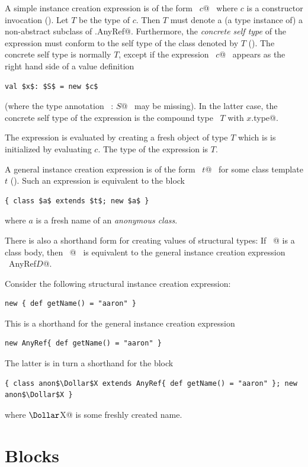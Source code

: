 A simple instance creation expression is of the form 
~\lstinline@new $c$@~ 
where $c$ is a constructor invocation
().  Let $T$ be the type of $c$. Then $T$ must
denote a (a type instance of) a non-abstract subclass of
\lstinline@scala.AnyRef@. Furthermore, the {\em concrete self type} of the
expression must conform to the self type of the class denoted by $T$
(). The concrete self type is normally
$T$, except if the expression ~\lstinline@new $c$@~ appears as the
right hand side of a value definition
\begin{lstlisting}
val $x$: $S$ = new $c$
\end{lstlisting}
(where the type annotation ~\lstinline@: $S$@~ may be missing).
In the latter case, the concrete self type of the expression is the
compound type ~\lstinline@$T$ with $x$.type@.

The expression is evaluated by creating a fresh
object of type $T$ which is is initialized by evaluating $c$. The
type of the expression is $T$.

A general instance creation expression is of the form 
~\lstinline@new $t$@~ for some class template $t$ ().
Such an expression is equivalent to the block
\begin{lstlisting}
{ class $a$ extends $t$; new $a$ }
\end{lstlisting}
where $a$ is a fresh name of an {\em anonymous class}.

There is also a shorthand form for creating values of structural
types: If ~@ is a class body, then 
~@~ is equivalent to the general instance creation expression
~\lstinline@new AnyRef{$D$}@.

\example Consider the following structural instance creation
expression:
\begin{lstlisting}
new { def getName() = "aaron" }
\end{lstlisting}
This is a shorthand for the general instance creation expression
\begin{lstlisting}
new AnyRef{ def getName() = "aaron" }
\end{lstlisting}
The latter is in turn a shorthand for the block
\begin{lstlisting}
{ class anon$\Dollar$X extends AnyRef{ def getName() = "aaron" }; new anon$\Dollar$X }
\end{lstlisting}
where \lstinline@anon$\Dollar$X@ is some freshly created name.

\section{Blocks}
\label{sec:blocks}

